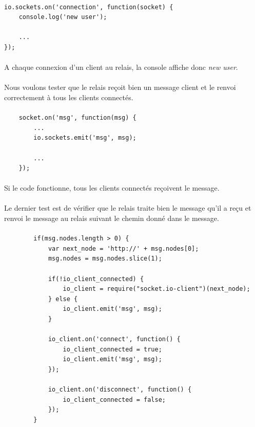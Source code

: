 \documentclass[a4paper,12pt]{report}
\begin{document}
	\paragraph*{}
	\begin{lstlisting}
io.sockets.on('connection', function(socket) {
	console.log('new user');
	
	...
});
	\end{lstlisting}
	
	\paragraph*{}
	A chaque connexion d'un client au relais, la console affiche donc \emph{new user}.
	
	\paragraph*{}
	Nous voulons tester que le relais reçoit bien un message client et le renvoi correctement à tous les clients connectés. 
	
	\paragraph*{}
	\begin{lstlisting}
	socket.on('msg', function(msg) {
		...
		io.sockets.emit('msg', msg);

		...
	});
	\end{lstlisting}	
	
	\paragraph*{}
	Si le code fonctionne, tous les clients connectés reçoivent le message.
		
	\paragraph*{}
	Le dernier test est de vérifier que le relais traite bien le message qu'il a reçu et renvoi le message au relais suivant le chemin donné dans le message.
	
	\paragraph*{}
	\begin{lstlisting}
		if(msg.nodes.length > 0) {
			var next_node = 'http://' + msg.nodes[0];
			msg.nodes = msg.nodes.slice(1);

			if(!io_client_connected) {
				io_client = require("socket.io-client")(next_node);
			} else {
				io_client.emit('msg', msg);			
			}

			io_client.on('connect', function() {
				io_client_connected = true;
				io_client.emit('msg', msg);
			});

			io_client.on('disconnect', function() {
				io_client_connected = false;
			});	
		}
	\end{lstlisting}
	
\end{document}
